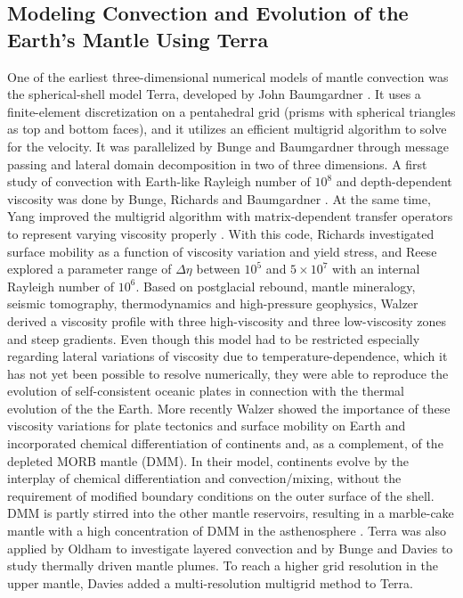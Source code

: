 \documentclass[times]{fldauth}
\begin{document}
\subsection{Modeling Convection and Evolution of the Earth's Mantle Using Terra}
One of the earliest three-dimensional numerical models of mantle convection was the 
spherical-shell model Terra, developed by John Baumgardner \cite{Baumgardner1983,Baumgardner1985a}.
It uses a finite-element discretization on a pentahedral grid (prisms with spherical triangles as top and bottom faces), and it utilizes
an efficient multigrid algorithm to solve for the velocity. 
It was parallelized by Bunge and Baumgardner \cite{Bunge1995} through message passing and
lateral domain decomposition in two of three dimensions. A first study of
convection with Earth-like Rayleigh number of $10^8$ and depth-dependent
viscosity was done by Bunge, Richards and Baumgardner \cite{Bunge1997}. 
At the same time, Yang \cite{Yang1997}
improved the multigrid algorithm with matrix-dependent transfer operators to
represent varying viscosity properly . With this code,
Richards \cite{Richards2001} investigated surface mobility as a function of viscosity
variation and yield stress, and Reese \cite{Reese2005} explored a parameter range of 
$\Delta \eta$ between $10^5$ and $5 \times 10^7$ with an internal Rayleigh
number of $10^6$. Based on postglacial rebound, mantle mineralogy, seismic tomography, 
thermodynamics and high-pressure geophysics, Walzer \cite{Walzer2004a} derived a viscosity profile with three
high-viscosity and three low-viscosity zones and steep gradients.
Even though this  model  had to be restricted especially regarding lateral variations of viscosity 
due to temperature-dependence, which it has not yet been possible to resolve numerically,
they were able to reproduce the evolution of self-consistent oceanic plates 
in connection with the thermal evolution of the the Earth. 
More recently Walzer \cite{Walzer2008a,Walzer2008b} showed the importance of these viscosity
variations for plate tectonics and surface mobility on Earth and incorporated
chemical differentiation of continents and, as a complement, of the
depleted MORB mantle (DMM). In their model, continents evolve by the interplay
of chemical differentiation and convection/mixing, without the requirement
of modified boundary conditions on the outer surface of the shell. DMM is partly
stirred into the other mantle reservoirs, resulting in a marble-cake mantle with
a high concentration of DMM in the asthenosphere \cite{Walzer2011}.
Terra was also applied by Oldham \cite{Oldham2004} to investigate layered convection 
and by Bunge and Davies \cite{Bunge2005,Davies2005a,Davies2005,Davies2009} to study thermally driven mantle plumes.
To reach a higher grid resolution in the upper mantle, Davies \cite{Davies2008} added
a multi-resolution multigrid method to Terra.
\end{document}
